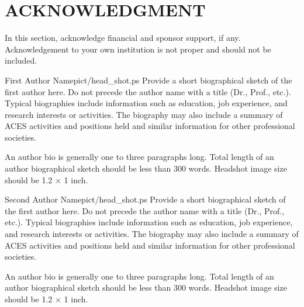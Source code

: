 \documentclass[letterpaper,twocolumn]{ACESJournal}
\newcommand{\red}[1]{{\color{red}#1}}
\begin{document}
\section*{ACKNOWLEDGMENT}
%
In this section, acknowledge financial and sponsor support, if any. \red{Acknowledgement to your own institution is not proper and should not be included.}
%


%
\begin{ACESbiography}{First Author Name}{pict/head_shot.ps}
Provide a short biographical sketch of the first author here. \red{Do not precede the author name with a title (Dr., Prof., etc.).} Typical biographies include information such as education, job experience, and research interests or activities. The biography may also include a summary of ACES activities and positions held and similar information for other professional societies.

An author bio is generally one to three paragraphs long. \red{Total length of an author biographical sketch should be less than 300 words.} Headshot image size should be 1.2 $\times$ 1 inch.
\end{ACESbiography}
%
\begin{ACESbiography}{Second Author Name}{pict/head_shot.ps}
Provide a short biographical sketch of the first author here. \red{Do not precede the author name with a title (Dr., Prof., etc.).} Typical biographies include information such as education, job experience, and research interests or activities. The biography may also include a summary of ACES activities and positions held and similar information for other professional societies.

An author bio is generally one to three paragraphs long. \red{Total length of an author biographical sketch should be less than 300 words.} Headshot image size should be 1.2 $\times$ 1 inch.
\end{ACESbiography}
%
%
\end{document}
